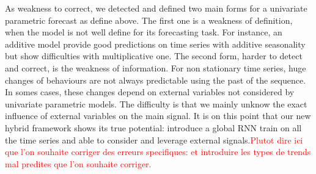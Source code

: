 \documentclass{article} %
\newcommand{\ts}{y}
\newcommand{\fullts}{{\bf \ts}}
\newcommand{\lag}{h}
\begin{document}
As weakness to correct, we detected and defined two main forms for a univariate parametric forecast as define above. The first one is a weakness of definition, when the model is not well define for its forecasting task. For instance, an additive model provide good predictions on time series with additive seasonality but show difficulties with multiplicative one. The second form, harder to detect and correct, is the weakness of information. For non stationary time series, huge changes of behaviours are not always predictable using the past of the sequence. In somes cases, these changes depend on external variables not considered by univariate parametric models. The difficulty is that we mainly unknow the exact influence of external variables on the main signal. It is on this point that our new hybrid framework shows its true potential: introduce a global RNN train on all the time series and able to consider and leverage external signals.\textcolor{red}{Plutot dire ici que l'on souhaite corriger des erreurs specifiques: et introduire les types de trends mal predites que l'on souhaite corriger.}

\end{document}
